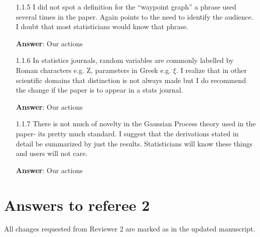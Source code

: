 \documentclass[a4paper]{article}
\newcounter{reviewer}
\def\action{\textbf{Answer}}
\newcommand{\srevcomment}[1]{{\color{red}{\{Rev 2: #1\}}}}
\begin{document}
\begin{answers}
\begin{itemize}[noitemsep,topsep=0pt,parsep=0pt,partopsep=0pt]
\item[1.1.5] I did not spot a definition for the “waypoint graph” a phrase used several times in the paper. Again points to the need to identify the audience. I doubt that most statisticians would know that phrase.\par
\action: Our actions
\vspace{1em}

\item[1.1.6] In statistics journals, random variables are commonly labelled by Roman characters e.g. Z, parameters in Greek e.g. $\xi$. I realize that in other scientific domains that distinction is not always made but I do recommend the change if the paper is to appear in a stats journal.\par 
\action: Our actions
\vspace{1em}

\item[1.1.7] There is not much of novelty in the Gaussian Process theory used in the paper- its pretty much standard. I suggest that the derivations stated in detail be summarized by just the results. Statisticians will know these things and users will not care.\par
\action: Our actions
\vspace{1em}

\end{itemize}

\end{answers}

\section*{Answers to referee 2}
All changes requested from Reviewer 2 are marked as \srevcomment{red text}
in the updated manuscript.

\setcounter{reviewer}{2}
\end{document}
